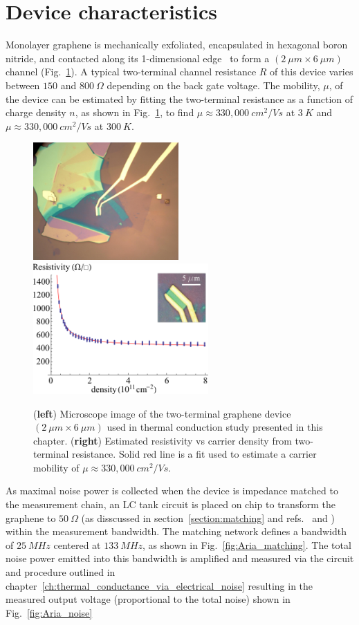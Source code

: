 \section{Device characteristics}
Monolayer graphene is mechanically exfoliated, encapsulated in hexagonal boron nitride, and contacted along its 1-dimensional edge~\cite{wang_one-dimensional_2013} to form a $(2~\mu m\times6~\mu m)$ channel (Fig.~\ref{fig:Aria}). A typical two-terminal channel resistance $R$ of this device varies between $150$ and $800~\Omega$ depending on the back gate voltage. The mobility, $\mu$, of the device can be estimated by fitting the two-terminal resistance as a function of charge density $n$, as shown in Fig.~\ref{fig:Aria}, to find $\mu\approx 330,000~cm^2/Vs$ at $3~K$ and $\mu\approx 330,000~cm^2/Vs$ at $300~K$.
\begin{figure}
\centering
\includegraphics[height=45mm, valign=t]{figures/high_density_graphene/picture_aria.jpg}
\includegraphics[height=50mm, valign=t]{figures/high_density_graphene/mobility.png}
\caption{(\textbf{left}) Microscope image of the two-terminal graphene device $(2~\mu m\times6~\mu m)$ used in thermal conduction study presented in this chapter. (\textbf{right}) Estimated resistivity vs carrier density from two-terminal resistance. Solid red line is a fit used to estimate a carrier mobility of $\mu\approx 330,000~cm^2/Vs$.}
\label{fig:Aria}
\end{figure}

As maximal noise power is collected when the device is impedance matched to the measurement chain, an LC tank circuit is placed on chip to transform the graphene to $50~\Omega$ (as disscussed in section~\ref{section:matching} and refs.~\cite{fong_ultrasensitive_2012} and  \cite{schoelkopf_radio-frequency_1998}) within the measurement bandwidth. The matching network defines a bandwidth of $25~MHz$ centered at $133~MHz$, as shown in Fig.~\ref{fig:Aria_matching}. The total noise power emitted into this bandwidth is amplified and measured via the circuit and procedure outlined in chapter~\ref{ch:thermal_conductance_via_electrical_noise} resulting in the measured output voltage (proportional to the total noise) shown in Fig.~\ref{fig:Aria_noise}

